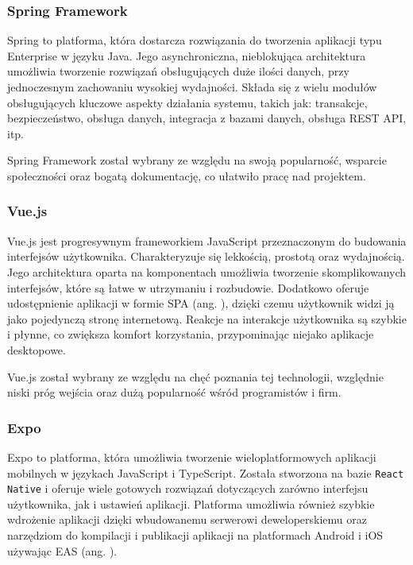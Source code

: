 \subsubsection*{Spring Framework}

Spring to platforma, która dostarcza rozwiązania do tworzenia aplikacji typu Enterprise w języku Java. Jego asynchroniczna, nieblokująca architektura umożliwia tworzenie rozwiązań obsługujących duże ilości danych, przy jednoczesnym zachowaniu wysokiej wydajności. Składa się z wielu modułów obsługujących kluczowe aspekty działania systemu, takich jak: transakcje, bezpieczeństwo, obsługa danych, integracja z bazami danych, obsługa REST API, itp. \cite{bib:spring}

Spring Framework został wybrany ze względu na swoją popularność, wsparcie społeczności oraz bogatą dokumentację, co ułatwiło pracę nad projektem.

\subsubsection*{Vue.js}

Vue.js jest progresywnym frameworkiem JavaScript przeznaczonym do budowania interfejsów użytkownika. Charakteryzuje się lekkością, prostotą oraz wydajnością. Jego architektura oparta na komponentach umożliwia tworzenie skomplikowanych interfejsów, które są łatwe w utrzymaniu i rozbudowie. Dodatkowo oferuje udostępnienie aplikacji w formie SPA (ang. ), dzięki czemu użytkownik widzi ją jako pojedynczą stronę internetową. Reakcje na interakcje użytkownika są szybkie i płynne, co zwiększa komfort korzystania, przypominając niejako aplikacje desktopowe. \cite{bib:vuejs}

Vue.js został wybrany ze względu na chęć poznania tej technologii, względnie niski próg wejścia oraz dużą popularność wśród programistów i firm.

\subsubsection*{Expo}

Expo to platforma, która umożliwia tworzenie wieloplatformowych aplikacji mobilnych w językach JavaScript i TypeScript. Została stworzona na bazie \texttt{React Native} i oferuje wiele gotowych rozwiązań dotyczących zarówno interfejsu użytkownika, jak i ustawień aplikacji. Platforma umożliwia również szybkie wdrożenie aplikacji dzięki wbudowanemu serwerowi deweloperskiemu oraz narzędziom do kompilacji i publikacji aplikacji na platformach Android i iOS używając EAS (ang. ). \cite{bib:expo}

